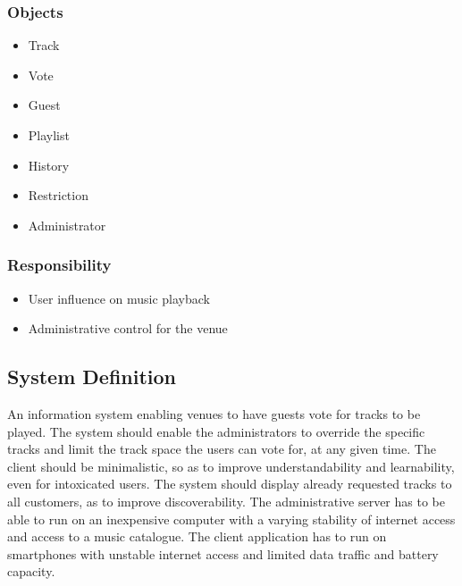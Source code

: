 \subsubsection{Objects}
\begin{itemize}
    \item Track
    \item Vote
    \item Guest
    \item Playlist
		\item History
    \item Restriction
    \item Administrator
\end{itemize}

\subsubsection{Responsibility}
\begin{itemize}
    \item User influence on music playback
    \item Administrative control for the venue
\end{itemize}

\subsection{System Definition}
\label{sub:systemDefinition}
An information system enabling venues to have guests vote for tracks to be played. The system should enable the administrators to override the specific tracks and limit the track space the users can vote for, at any given time. The client should be minimalistic, so as to improve understandability and learnability, even for intoxicated users. The system should display already requested tracks to all customers, as to improve discoverability.
The administrative server has to be able to run on an inexpensive computer with a varying stability of internet access and access to a music catalogue. The client application has to run on smartphones with unstable internet access and limited data traffic and battery capacity.